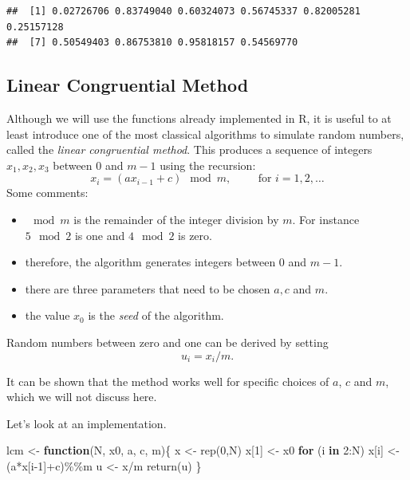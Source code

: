\documentclass[
]{book}
\newenvironment{Shaded}{\begin{snugshade}}{\end{snugshade}}
\newcommand{\ControlFlowTok}[1]{\textcolor[rgb]{0.13,0.29,0.53}{\textbf{#1}}}
\newcommand{\DecValTok}[1]{\textcolor[rgb]{0.00,0.00,0.81}{#1}}
\newcommand{\FunctionTok}[1]{\textcolor[rgb]{0.00,0.00,0.00}{#1}}
\newcommand{\NormalTok}[1]{#1}
\newcommand{\OtherTok}[1]{\textcolor[rgb]{0.56,0.35,0.01}{#1}}
\newcommand{\SpecialCharTok}[1]{\textcolor[rgb]{0.00,0.00,0.00}{#1}}
\theoremstyle{definition}
\theoremstyle{definition}
\theoremstyle{definition}
\theoremstyle{definition}
\theoremstyle{remark}
\begin{document}
\begin{verbatim}
##  [1] 0.02726706 0.83749040 0.60324073 0.56745337 0.82005281 0.25157128
##  [7] 0.50549403 0.86753810 0.95818157 0.54569770
\end{verbatim}

\hypertarget{linear-congruential-method}{%
\subsection{Linear Congruential Method}\label{linear-congruential-method}}

Although we will use the functions already implemented in R, it is useful to at least introduce one of the most classical algorithms to simulate random numbers, called the \emph{linear congruential method}.
This produces a sequence of integers \(x_1,x_2,x_3\) between 0 and \(m-1\) using the recursion:
\[
x_{i}=(ax_{i-1}+c)\mod m, \hspace{1cm} \mbox{for } i = 1,2,\dots
\]
Some comments:

\begin{itemize}
\item
  \(\mod m\) is the remainder of the integer division by \(m\). For instance \(5 \mod 2\) is one and \(4\mod 2\) is zero.
\item
  therefore, the algorithm generates integers between 0 and \(m-1\).
\item
  there are three parameters that need to be chosen \(a, c\) and \(m\).
\item
  the value \(x_0\) is the \emph{seed} of the algorithm.
\end{itemize}

Random numbers between zero and one can be derived by setting
\[
u_i= x_i/m.
\]

It can be shown that the method works well for specific choices of \(a\), \(c\) and \(m\), which we will not discuss here.

Let's look at an implementation.

\begin{Shaded}
\begin{Highlighting}[]
\NormalTok{lcm }\OtherTok{\textless{}{-}} \ControlFlowTok{function}\NormalTok{(N, x0, a, c, m)\{}
\NormalTok{   x }\OtherTok{\textless{}{-}} \FunctionTok{rep}\NormalTok{(}\DecValTok{0}\NormalTok{,N)}
\NormalTok{   x[}\DecValTok{1}\NormalTok{] }\OtherTok{\textless{}{-}}\NormalTok{ x0}
   \ControlFlowTok{for}\NormalTok{ (i }\ControlFlowTok{in} \DecValTok{2}\SpecialCharTok{:}\NormalTok{N) x[i] }\OtherTok{\textless{}{-}}\NormalTok{ (a}\SpecialCharTok{*}\NormalTok{x[i}\DecValTok{{-}1}\NormalTok{]}\SpecialCharTok{+}\NormalTok{c)}\SpecialCharTok{\%\%}\NormalTok{m}
\NormalTok{   u }\OtherTok{\textless{}{-}}\NormalTok{ x}\SpecialCharTok{/}\NormalTok{m}
   \FunctionTok{return}\NormalTok{(u)}
\NormalTok{\}}
\end{Highlighting}
\end{Shaded}
\end{document}
